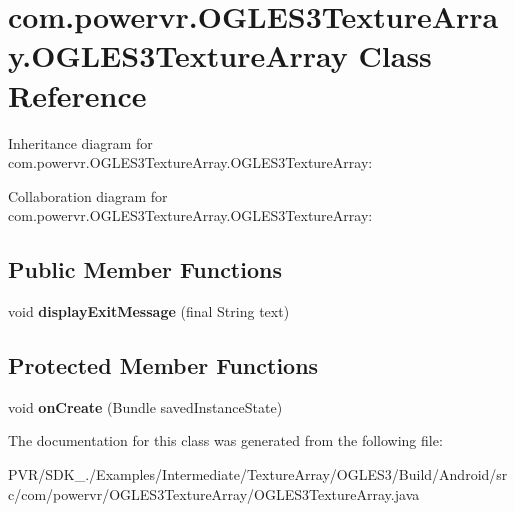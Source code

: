 \hypertarget{classcom_1_1powervr_1_1_o_g_l_e_s3_texture_array_1_1_o_g_l_e_s3_texture_array}{\section{com.\+powervr.\+O\+G\+L\+E\+S3\+Texture\+Array.\+O\+G\+L\+E\+S3\+Texture\+Array Class Reference}
\label{classcom_1_1powervr_1_1_o_g_l_e_s3_texture_array_1_1_o_g_l_e_s3_texture_array}
}


Inheritance diagram for com.\+powervr.\+O\+G\+L\+E\+S3\+Texture\+Array.\+O\+G\+L\+E\+S3\+Texture\+Array\+:


Collaboration diagram for com.\+powervr.\+O\+G\+L\+E\+S3\+Texture\+Array.\+O\+G\+L\+E\+S3\+Texture\+Array\+:
\subsection*{Public Member Functions}
\begin{DoxyCompactItemize}
\item 
\hypertarget{classcom_1_1powervr_1_1_o_g_l_e_s3_texture_array_1_1_o_g_l_e_s3_texture_array_a03271bae218ddd00e719eb32e07b7075}{void {\bfseries display\+Exit\+Message} (final String text)}\label{classcom_1_1powervr_1_1_o_g_l_e_s3_texture_array_1_1_o_g_l_e_s3_texture_array_a03271bae218ddd00e719eb32e07b7075}

\end{DoxyCompactItemize}
\subsection*{Protected Member Functions}
\begin{DoxyCompactItemize}
\item 
\hypertarget{classcom_1_1powervr_1_1_o_g_l_e_s3_texture_array_1_1_o_g_l_e_s3_texture_array_aa4464862010851e4e32101f14104d64b}{void {\bfseries on\+Create} (Bundle saved\+Instance\+State)}\label{classcom_1_1powervr_1_1_o_g_l_e_s3_texture_array_1_1_o_g_l_e_s3_texture_array_aa4464862010851e4e32101f14104d64b}

\end{DoxyCompactItemize}


The documentation for this class was generated from the following file\+:\begin{DoxyCompactItemize}
\item 
P\+V\+R/\+S\+D\+K\+\_./\+Examples/\+Intermediate/\+Texture\+Array/\+O\+G\+L\+E\+S3/\+Build/\+Android/src/com/powervr/\+O\+G\+L\+E\+S3\+Texture\+Array/O\+G\+L\+E\+S3\+Texture\+Array.\+java\end{DoxyCompactItemize}
